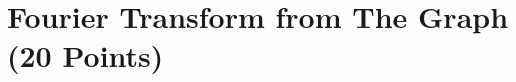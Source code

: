 \documentclass[12pt, xcolor=dvipsnames,svgnames,x11names]{article}
\begin{document}
%
%
%
%
%
%
%



\section{Fourier Transform from The Graph (20 Points)}

\label{sec:doubletriangle2}
\end{document}
